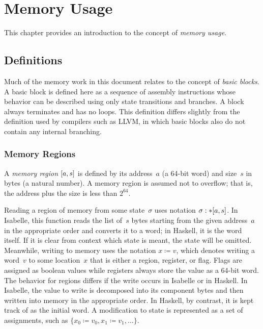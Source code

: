 \chapter{Memory Usage}\label{ch:memory}
This chapter provides an introduction to the concept of \emph{memory usage}.%


\section{Definitions}
Much of the memory work in this document relates to the concept of \emph{basic blocks}.
A basic block is defined here as a sequence of assembly instructions
whose behavior can be described using only state transitions and branches.
A block always terminates and has no loops.
This definition differs slightly from the definition used by compilers such as LLVM,
in which basic blocks also do not contain any internal branching.

\subsection{Memory Regions}\label{memory_regions}
A \emph{memory region}%
$[a,s]$ is defined by its address~$a$ (a 64-bit word) and size~$s$ in bytes
(a natural number).
A memory region is assumed not to overflow;
that is, the address plus the size is less than $2^{64}$.

Reading a region of memory from some state~$\sigma$
uses notation $\sigma:\ast[a,s]$.
In Isabelle, this function reads the list of~$s$ bytes starting from the given address~$a$
in the appropriate order and converts it to a word;
in Haskell, it is the word itself.
If it is clear from context which state is meant, the state will be omitted.
Meanwhile, writing to memory uses the notation $x\coloneqq v$,
which denotes writing a word~$v$ to some location~$x$ that is either a region,
register, or flag. Flags are assigned as boolean values while
registers always store the value as a 64-bit word.
The behavior for regions differs if the write occurs in Isabelle or in Haskell.
In Isabelle, the value to write is decomposed into its component bytes
and then written into memory in the appropriate order.
In Haskell, by contrast, it is kept track of as the initial word.
A modification to state is represented as a set of assignments,
such as $\{x_0\coloneqq v_0,x_1\coloneqq v_1,\dotsc\}$.





